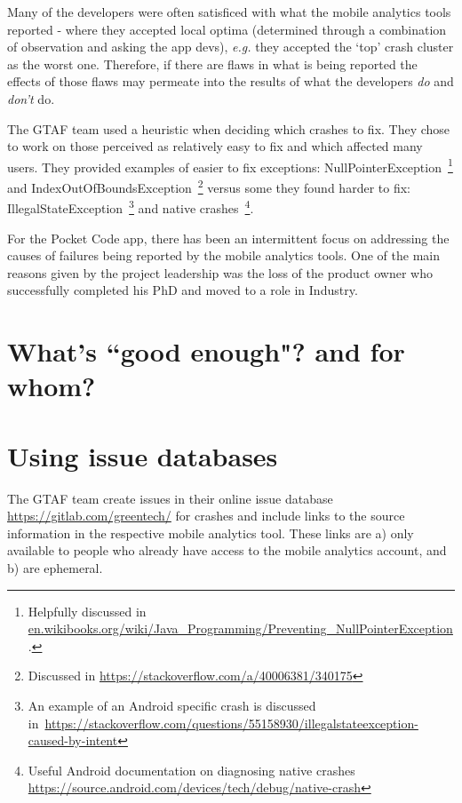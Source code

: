 Many of the developers were often satisficed with what the mobile analytics tools reported - where they accepted local optima (determined through a combination of observation and asking the app devs), \textit{e.g.} they accepted the `top' crash cluster as the worst one. Therefore, if there are flaws in what is being reported the effects of those flaws may permeate into the results of what the developers \textit{do} and \textit{don't} do. 


The GTAF team used a heuristic when deciding which crashes to fix. They chose to work on those perceived as relatively easy to fix and which affected many users. They provided examples of easier to fix exceptions: NullPointerException~\footnote{Helpfully discussed in \href{https://en.wikibooks.org/wiki/Java\_Programming/Preventing\_NullPointerException}{en.wikibooks.org/wiki/Java\_Programming/Preventing\_NullPointerException}.} and IndexOutOfBoundsException~\footnote{Discussed in \url{https://stackoverflow.com/a/40006381/340175}} versus some they found harder to fix: IllegalStateException~\footnote{An example of an Android specific crash is discussed in~\url{https://stackoverflow.com/questions/55158930/illegalstateexception-caused-by-intent}} and native crashes~\footnote{Useful Android documentation on diagnosing native crashes \url{https://source.android.com/devices/tech/debug/native-crash}}.



For the Pocket Code app, there has been an intermittent focus on addressing the causes of failures being reported by the mobile analytics tools. One of the main reasons given by the project leadership was the loss of the product owner who successfully completed his PhD and moved to a role in Industry. 

\section{What's ``good enough"? and for whom?}

\section{Using issue databases}
The GTAF team create issues in their online issue database \url{https://gitlab.com/greentech/} for crashes and include links to the source information in the respective mobile analytics tool. These links are a) only available to people who already have access to the mobile analytics account, and b) are ephemeral.

